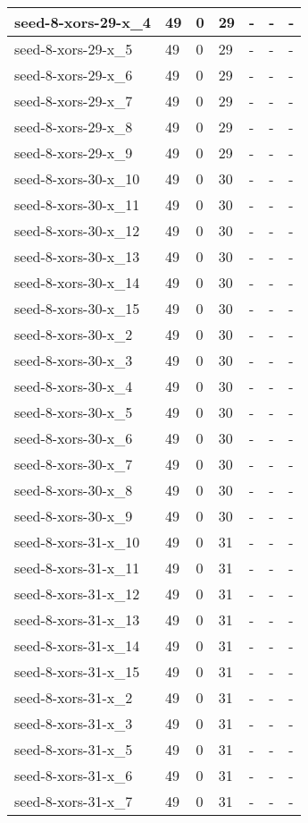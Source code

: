\begin{scriptsize}
\begin{longtable}{|p{5cm}|l|l|l|l|l|l|}
seed-8-xors-29-x\_4&49&0&29&-&-&- \\ \hline 
seed-8-xors-29-x\_5&49&0&29&-&-&- \\ \hline 
seed-8-xors-29-x\_6&49&0&29&-&-&- \\ \hline 
seed-8-xors-29-x\_7&49&0&29&-&-&- \\ \hline 
seed-8-xors-29-x\_8&49&0&29&-&-&- \\ \hline 
seed-8-xors-29-x\_9&49&0&29&-&-&- \\ \hline 
seed-8-xors-30-x\_10&49&0&30&-&-&- \\ \hline 
seed-8-xors-30-x\_11&49&0&30&-&-&- \\ \hline 
seed-8-xors-30-x\_12&49&0&30&-&-&- \\ \hline 
seed-8-xors-30-x\_13&49&0&30&-&-&- \\ \hline 
seed-8-xors-30-x\_14&49&0&30&-&-&- \\ \hline 
seed-8-xors-30-x\_15&49&0&30&-&-&- \\ \hline 
seed-8-xors-30-x\_2&49&0&30&-&-&- \\ \hline 
seed-8-xors-30-x\_3&49&0&30&-&-&- \\ \hline 
seed-8-xors-30-x\_4&49&0&30&-&-&- \\ \hline 
seed-8-xors-30-x\_5&49&0&30&-&-&- \\ \hline 
seed-8-xors-30-x\_6&49&0&30&-&-&- \\ \hline 
seed-8-xors-30-x\_7&49&0&30&-&-&- \\ \hline 
seed-8-xors-30-x\_8&49&0&30&-&-&- \\ \hline 
seed-8-xors-30-x\_9&49&0&30&-&-&- \\ \hline 
seed-8-xors-31-x\_10&49&0&31&-&-&- \\ \hline 
seed-8-xors-31-x\_11&49&0&31&-&-&- \\ \hline 
seed-8-xors-31-x\_12&49&0&31&-&-&- \\ \hline 
seed-8-xors-31-x\_13&49&0&31&-&-&- \\ \hline 
seed-8-xors-31-x\_14&49&0&31&-&-&- \\ \hline 
seed-8-xors-31-x\_15&49&0&31&-&-&- \\ \hline 
seed-8-xors-31-x\_2&49&0&31&-&-&- \\ \hline 
seed-8-xors-31-x\_3&49&0&31&-&-&- \\ \hline 
seed-8-xors-31-x\_5&49&0&31&-&-&- \\ \hline 
seed-8-xors-31-x\_6&49&0&31&-&-&- \\ \hline 
seed-8-xors-31-x\_7&49&0&31&-&-&- \\ \hline 

\end{longtable}
\end{scriptsize}

